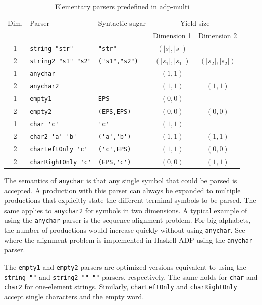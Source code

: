 \documentclass[
    a4paper,
    12pt,
    twoside,
    BCOR=12mm,
    parskip=half,
    chapterprefix,
    numbers=noenddot,
    bibliography=totoc
]{scrbook}
\begin{document}
\begin{table}
	\centering
	\caption{Elementary parsers predefined in adp-multi}
	\begin{tabular}{@{}cllcc@{}}
		\toprule
		Dim. & Parser & Syntactic sugar & \multicolumn{2}{c}{Yield size} \\
		\cmidrule{4-5}
		&&& Dimension 1 & Dimension 2\\
		\midrule
		1 & \verb|string "str"| & \verb|"str"| & $(|s|,|s|)$ \\ 
		2 & \verb|string2 "s1" "s2"| & \verb|("s1","s2")| & $(|s_1|,|s_1|)$ & $(|s_2|,|s_2|)$ \\ 
		1 & \verb|anychar| &  & $(1,1)$ \\ 
		2 & \verb|anychar2| &  & $(1,1)$ & $(1,1)$ \\ 
		1 & \verb|empty1| & \verb|EPS| & $(0,0)$ \\ 
		2 & \verb|empty2| & \verb|(EPS,EPS)| & $(0,0)$ & $(0,0)$ \\ 
		1 & \verb|char 'c'| & \verb|'c'| & $(1,1)$ \\ 
		2 & \verb|char2 'a' 'b'| & \verb|('a','b')| & $(1,1)$ & $(1,1)$ \\ 
		2 & \verb|charLeftOnly 'c'| & \verb|('c',EPS)| & $(1,1)$ & $(0,0)$ \\ 
		2 & \verb|charRightOnly 'c'| & \verb|(EPS,'c')| & $(0,0)$ & $(1,1)$ \\
		\bottomrule
	\end{tabular}
	\label{tab:parsers}
\end{table}

The semantics of \verb|anychar| is that any single symbol that could be parsed is accepted. A production with this parser can always be expanded to multiple productions that explicitly state the different terminal symbols to be parsed. The same applies to \verb|anychar2| for symbols in two dimensions.
A typical example of using the \verb|anychar| parser is the sequence alignment problem. For big alphabets, the number of productions would increase quickly without using \verb|anychar|. See \citet[sect. 3.6]{giegerich_discipline_2004} where the alignment problem is implemented in Haskell-ADP using the \verb|anychar| parser.

The \verb|empty1| and \verb|empty2| parsers are optimized versions equivalent to using the \verb|string ""| and \verb|string2 "" ""| parsers, respectively. The same holds for \verb|char| and \verb|char2| for one-element strings. Similarly, \verb|charLeftOnly| and \verb|charRightOnly| accept single characters and the empty word.
\end{document}
